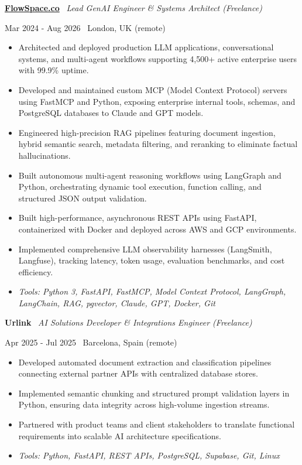 \documentclass[a4paper,10pt]{article}
\newcommand{\role}[4]{%
  \vspace{2pt}\noindent
  \begin{minipage}[t]{0.70\textwidth}\raggedright\textbf{#1} \textbullet\ \textit{#3}\end{minipage}%
  \hfill
  \begin{minipage}[t]{0.28\textwidth}\raggedleft\footnotesize\color{gray}#2 \textbullet\ #4\end{minipage}%
  \vspace{1pt}%
}
\begin{document}
\role{\href{https://flowspace.co}{FlowSpace.co}}{Mar 2024 - Aug 2026}{Lead GenAI Engineer \& Systems Architect (Freelance)}{London, UK (remote)}
\begin{itemize}
  \item Architected and deployed production LLM applications, conversational systems, and multi-agent workflows supporting 4,500+ active enterprise users with 99.9\% uptime.
  \item Developed and maintained custom MCP (Model Context Protocol) servers using FastMCP and Python, exposing enterprise internal tools, schemas, and PostgreSQL databases to Claude and GPT models.
  \item Engineered high-precision RAG pipelines featuring document ingestion, hybrid semantic search, metadata filtering, and reranking to eliminate factual hallucinations.
  \item Built autonomous multi-agent reasoning workflows using LangGraph and Python, orchestrating dynamic tool execution, function calling, and structured JSON output validation.
  \item Built high-performance, asynchronous REST APIs using FastAPI, containerized with Docker and deployed across AWS and GCP environments.
  \item Implemented comprehensive LLM observability harnesses (LangSmith, Langfuse), tracking latency, token usage, evaluation benchmarks, and cost efficiency.
  \item \textit{Tools: Python 3, FastAPI, FastMCP, Model Context Protocol, LangGraph, LangChain, RAG, pgvector, Claude, GPT, Docker, Git}
\end{itemize}

\role{Urlink}{Apr 2025 - Jul 2025}{AI Solutions Developer \& Integrations Engineer (Freelance)}{Barcelona, Spain (remote)}
\begin{itemize}
  \item Developed automated document extraction and classification pipelines connecting external partner APIs with centralized database stores.
  \item Implemented semantic chunking and structured prompt validation layers in Python, ensuring data integrity across high-volume ingestion streams.
  \item Partnered with product teams and client stakeholders to translate functional requirements into scalable AI architecture specifications.
  \item \textit{Tools: Python, FastAPI, REST APIs, PostgreSQL, Supabase, Git, Linux}
\end{itemize}
\end{document}
